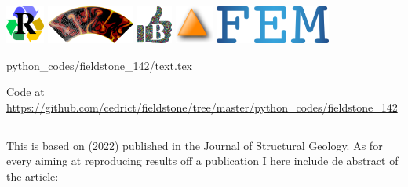 \includegraphics[height=1.25cm]{images/pictograms/replication}
\includegraphics[height=1.25cm]{images/pictograms/aspect_logo}
\includegraphics[height=1.25cm]{images/pictograms/benchmark}
\includegraphics[height=1.25cm]{images/pictograms/triangle}
\includegraphics[height=1.25cm]{images/pictograms/FEM}


\begin{flushright} {\tiny {\color{gray} python\_codes/fieldstone\_142/text.tex}} \end{flushright}



\begin{center}
Code at \url{https://github.com/cedrict/fieldstone/tree/master/python_codes/fieldstone_142}
\end{center}

\par\noindent\rule{\textwidth}{0.4pt}

This \stone is based on \textcite{hams22} (2022) published in the Journal of Structural Geology.
As for every \stone aiming at reproducing results off a publication I here include de abstract
of the article:

